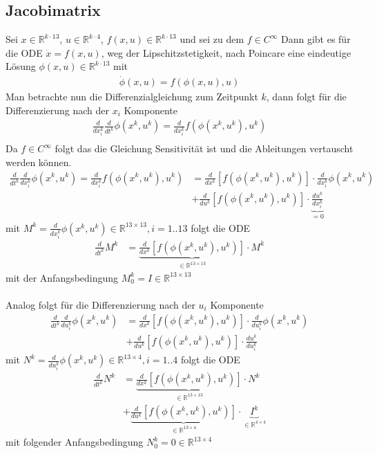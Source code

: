 \documentclass[12pt, a4paper]{scrartcl}
\begin{document}
\subsection*{Jacobimatrix}
Sei $x \in \mathbb{R}^{k \cdot 13}$, $u \in \mathbb{R}^{k \cdot 4}$, $f(x, u) \in \mathbb{R}^{k \cdot 13}$ und sei zu dem $f \in C^{\infty}$ Dann gibt es für die ODE $\dot x = f(x, u)$, weg der Lipschitzstetigkeit, nach Poincare eine eindeutige Lösung $\phi(x, u) \in \mathbb{R}^{k \cdot 13}$ mit 
\begin{align*}
 	\dot \phi(x, u) = f(\phi(x, u), u)
\end{align*}
Man betrachte nun die Differenzialgleichung zum Zeitpunkt $k$, dann folgt für die Differenzierung nach der $x_i$ Komponente
\begin{align*}
	\frac{d}{dx^k_i} \frac{d}{dt^k} \phi(x^k, u^k) = \frac{d}{dx^k_i} f(\phi(x^k, u^k), u^k) \\
\end{align*}
Da $f \in C^{\infty}$ folgt das die Gleichung Sensitivität ist und die Ableitungen vertauscht werden können.
\begin{align*}
\frac{d}{dt^k} \frac{d}{dx^k_i} \phi(x^k, u^k) = \frac{d}{dx^k_i} f(\phi(x^k, u^k), u^k)  &= \frac{d}{dx^k} \left[f(\phi(x^k, u^k), u^k) \right] \cdot \frac{d}{dx^k_i}\phi(x^k, u^k) \\
&+ \frac{d}{du^k}\left[ f(\phi(x^k, u^k), u^k)  \right] \cdot \underbrace{\frac{du^k}{dx^k_i}}_{=0}
\end{align*}
mit $M^k = \frac{d}{dx^k_i} \phi(x^k, u^k) \in \mathbb{R}^{13 \times 13}, i = 1..13$ folgt die ODE  
\begin{align*}
\frac{d}{dt^k} M^k &= \underbrace{\frac{d}{dx^k} \left[f(\phi(x^k, u^k), u^k) \right]}_{\in \mathbb{R}^{13 \times 13}} \cdot M^k
\end{align*}
mit der Anfangsbedingung $M_0^k = I \in \mathbb{R}^{13 \times 13} $ \\\\
Analog folgt für die Differenzierung nach der $u_i$ Komponente
\begin{align*}
\frac{d}{dt^k} \frac{d}{du^k_i} \phi(x^k, u^k) &= \frac{d}{dx^k} \left[f(\phi(x^k, u^k), u^k) \right] \cdot \frac{d}{du^k_i}\phi(x^k, u^k) \\
&+ \frac{d}{du^k}\left[ f(\phi(x^k, u^k), u^k)  \right] \cdot \frac{du^k}{du^k_i}
\end{align*}
mit $N^k = \frac{d}{du^k_i} \phi(x^k, u^k) \in \mathbb{R}^{13 \times 4}, i = 1..4$ folgt die ODE 
\begin{align*}
\frac{d}{dt^k} N^k &= \underbrace{\frac{d}{dx^k} \left[f(\phi(x^k, u^k), u^k) \right]}_{\in \mathbb{R}^{13 \times 13}} \cdot N^k \\
&+ \underbrace{
	\frac{d}{du^k}
		\left[ f(\phi(x^k, u^k), u^k)  \right]
		   }_
{\in \mathbb{R}^{13 \times 4}}
		   \cdot \underbrace{I^k}_{\in \mathbb{R}^{4 \times 4}}
\end{align*}
mit folgender Anfangsbedingung $N_0^k = 0 \in \mathbb{R}^{13 \times 4}$
\end{document}
